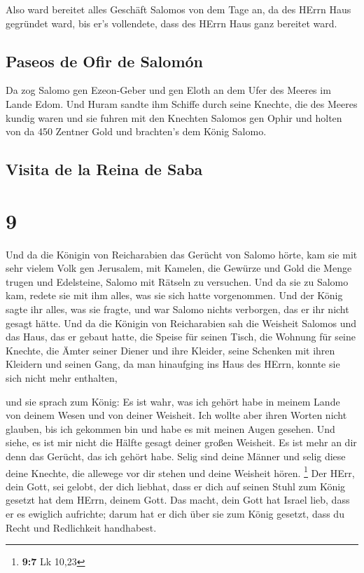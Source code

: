  Also ward bereitet alles Geschäft Salomos von dem Tage
an, da des HErrn Haus gegründet ward, bis er's vollendete, dass des
HErrn Haus ganz bereitet ward.

\hypertarget{paseos-de-ofir-de-salomuxf3n}{%
\subsection{Paseos de Ofir de
Salomón}\label{paseos-de-ofir-de-salomuxf3n}}

 Da zog Salomo gen Ezeon-Geber und gen Eloth an dem Ufer
des Meeres im Lande Edom.  Und Huram sandte ihm Schiffe
durch seine Knechte, die des Meeres kundig waren und sie fuhren mit den
Knechten Salomos gen Ophir und holten von da 450 Zentner Gold und
brachten's dem König Salomo.

\hypertarget{visita-de-la-reina-de-saba}{%
\subsection{Visita de la Reina de
Saba}\label{visita-de-la-reina-de-saba}}

\hypertarget{section-8}{%
\section{9}\label{section-8}}

 Und da die Königin von Reicharabien das Gerücht von
Salomo hörte, kam sie mit sehr vielem Volk gen Jerusalem, mit Kamelen,
die Gewürze und Gold die Menge trugen und Edelsteine, Salomo mit Rätseln
zu versuchen. Und da sie zu Salomo kam, redete sie mit ihm alles, was
sie sich hatte vorgenommen.  Und der König sagte ihr
alles, was sie fragte, und war Salomo nichts verborgen, das er ihr nicht
gesagt hätte.  Und da die Königin von Reicharabien sah die
Weisheit Salomos und das Haus, das er gebaut hatte,  die
Speise für seinen Tisch, die Wohnung für seine Knechte, die Ämter seiner
Diener und ihre Kleider, seine Schenken mit ihren Kleidern und seinen
Gang, da man hinaufging ins Haus des HErrn, konnte sie sich nicht mehr
enthalten,

 und sie sprach zum König: Es ist wahr, was ich gehört
habe in meinem Lande von deinem Wesen und von deiner Weisheit.
 Ich wollte aber ihren Worten nicht glauben, bis ich
gekommen bin und habe es mit meinen Augen gesehen. Und siehe, es ist mir
nicht die Hälfte gesagt deiner großen Weisheit. Es ist mehr an dir denn
das Gerücht, das ich gehört habe.  Selig sind deine Männer
und selig diese deine Knechte, die allewege vor dir stehen und deine
Weisheit hören. \footnote{\textbf{9:7} Lk 10,23}  Der
HErr, dein Gott, sei gelobt, der dich liebhat, dass er dich auf seinen
Stuhl zum König gesetzt hat dem HErrn, deinem Gott. Das macht, dein Gott
hat Israel lieb, dass er es ewiglich aufrichte; darum hat er dich über
sie zum König gesetzt, dass du Recht und Redlichkeit handhabest.

